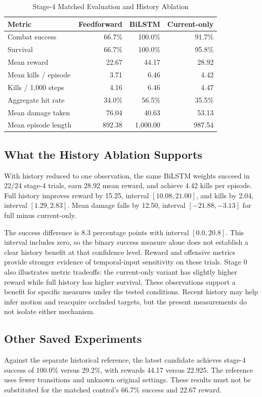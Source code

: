 \documentclass[conference]{IEEEtran}
\begin{document}
\begin{table}[t]
\caption{Stage-4 Matched Evaluation and History Ablation}
\label{tab:stagefour}
\centering\footnotesize
\begin{tabularx}{\columnwidth}{@{}Y r r r@{}}
\toprule Metric & Feedforward & BiLSTM & Current-only \\
\midrule
Combat success & 66.7\% & 100.0\% & 91.7\% \\
Survival & 66.7\% & 100.0\% & 95.8\% \\
Mean reward & 22.67 & 44.17 & 28.92 \\
Mean kills / episode & 3.71 & 6.46 & 4.42 \\
Kills / 1,000 steps & 4.16 & 6.46 & 4.47 \\
Aggregate hit rate & 34.0\% & 56.5\% & 35.5\% \\
Mean damage taken & 76.04 & 40.63 & 53.13 \\
Mean episode length & 892.38 & 1,000.00 & 987.54 \\
\bottomrule
\end{tabularx}
\end{table}

\subsection{What the History Ablation Supports}
With history reduced to one observation, the same BiLSTM weights succeed in 22/24 stage-4 trials, earn 28.92 mean reward, and achieve 4.42 kills per episode. Full history improves reward by 15.25, interval $[10.08,21.00]$, and kills by 2.04, interval $[1.29,2.83]$. Mean damage falls by 12.50, interval $[-21.88,-3.13]$ for full minus current-only.

The success difference is 8.3 percentage points with interval $[0.0,20.8]$. This interval includes zero, so the binary success measure alone does not establish a clear history benefit at that confidence level. Reward and offensive metrics provide stronger evidence of temporal-input sensitivity on these trials. Stage 0 also illustrates metric tradeoffs: the current-only variant has slightly higher reward while full history has higher survival. These observations support a benefit for specific measures under the tested conditions. Recent history may help infer motion and reacquire occluded targets, but the present measurements do not isolate either mechanism.

\subsection{Other Saved Experiments}
Against the separate historical reference, the latest candidate achieves stage-4 success of 100.0\% versus 29.2\%, with rewards 44.17 versus 22.925. The reference uses fewer transitions and unknown original settings. These results must not be substituted for the matched control's 66.7\% success and 22.67 reward.
\end{document}
